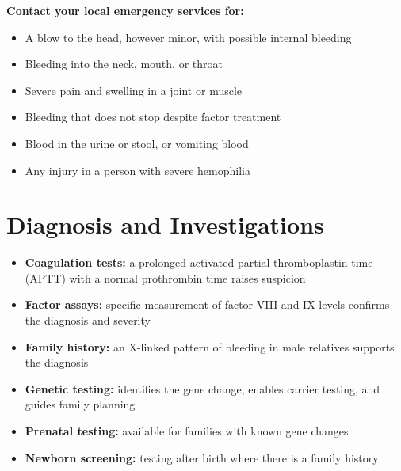 \textbf{Contact your local emergency services for:}
\begin{itemize}
    \item A blow to the head, however minor, with possible internal bleeding
    \item Bleeding into the neck, mouth, or throat
    \item Severe pain and swelling in a joint or muscle
    \item Bleeding that does not stop despite factor treatment
    \item Blood in the urine or stool, or vomiting blood
    \item Any injury in a person with severe hemophilia
\end{itemize}

\section*{Diagnosis and Investigations}
\begin{itemize}
    \item \textbf{Coagulation tests:} a prolonged activated partial thromboplastin time (APTT) with a normal prothrombin time raises suspicion
    \item \textbf{Factor assays:} specific measurement of factor VIII and IX levels confirms the diagnosis and severity
    \item \textbf{Family history:} an X-linked pattern of bleeding in male relatives supports the diagnosis
    \item \textbf{Genetic testing:} identifies the gene change, enables carrier testing, and guides family planning
    \item \textbf{Prenatal testing:} available for families with known gene changes
    \item \textbf{Newborn screening:} testing after birth where there is a family history
\end{itemize}

